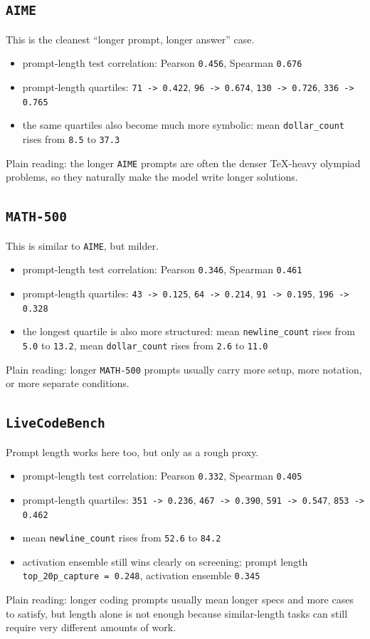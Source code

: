\documentclass[11pt]{article}
\begin{document}
\subsection*{\texttt{AIME}}
This is the cleanest ``longer prompt, longer answer'' case.
\begin{itemize}[leftmargin=1.5em]
\item prompt-length test correlation: Pearson \texttt{0.456}, Spearman \texttt{0.676}
\item prompt-length quartiles: \texttt{71 -> 0.422}, \texttt{96 -> 0.674}, \texttt{130 -> 0.726}, \texttt{336 -> 0.765}
\item the same quartiles also become much more symbolic: mean \texttt{dollar\_count} rises from \texttt{8.5} to \texttt{37.3}
\end{itemize}
Plain reading: the longer \texttt{AIME} prompts are often the denser TeX-heavy olympiad problems, so they naturally make the model write longer solutions.

\subsection*{\texttt{MATH-500}}
This is similar to \texttt{AIME}, but milder.
\begin{itemize}[leftmargin=1.5em]
\item prompt-length test correlation: Pearson \texttt{0.346}, Spearman \texttt{0.461}
\item prompt-length quartiles: \texttt{43 -> 0.125}, \texttt{64 -> 0.214}, \texttt{91 -> 0.195}, \texttt{196 -> 0.328}
\item the longest quartile is also more structured: mean \texttt{newline\_count} rises from \texttt{5.0} to \texttt{13.2}, mean \texttt{dollar\_count} rises from \texttt{2.6} to \texttt{11.0}
\end{itemize}
Plain reading: longer \texttt{MATH-500} prompts usually carry more setup, more notation, or more separate conditions.

\subsection*{\texttt{LiveCodeBench}}
Prompt length works here too, but only as a rough proxy.
\begin{itemize}[leftmargin=1.5em]
\item prompt-length test correlation: Pearson \texttt{0.332}, Spearman \texttt{0.405}
\item prompt-length quartiles: \texttt{351 -> 0.236}, \texttt{467 -> 0.390}, \texttt{591 -> 0.547}, \texttt{853 -> 0.462}
\item mean \texttt{newline\_count} rises from \texttt{52.6} to \texttt{84.2}
\item activation ensemble still wins clearly on screening: prompt length \texttt{top\_20p\_capture = 0.248}, activation ensemble \texttt{0.345}
\end{itemize}
Plain reading: longer coding prompts usually mean longer specs and more cases to satisfy, but length alone is not enough because similar-length tasks can still require very different amounts of work.
\end{document}
